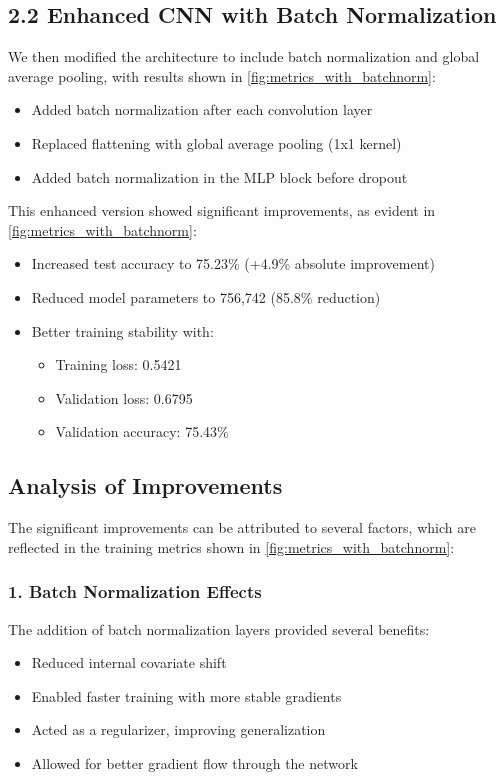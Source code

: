 \subsection{2.2 Enhanced CNN with Batch Normalization}
We then modified the architecture to include batch normalization and global average pooling, with results shown in \cref{fig:metrics_with_batchnorm}:

\begin{itemize}
    \item Added batch normalization after each convolution layer
    \item Replaced flattening with global average pooling (1x1 kernel)
    \item Added batch normalization in the MLP block before dropout
\end{itemize}

This enhanced version showed significant improvements, as evident in \cref{fig:metrics_with_batchnorm}:
\begin{itemize}
    \item Increased test accuracy to 75.23\% (+4.9\% absolute improvement)
    \item Reduced model parameters to 756,742 (85.8\% reduction)
    \item Better training stability with:
        \begin{itemize}
            \item Training loss: 0.5421
            \item Validation loss: 0.6795
            \item Validation accuracy: 75.43\%
        \end{itemize}
\end{itemize}

\subsection{Analysis of Improvements}

The significant improvements can be attributed to several factors, which are reflected in the training metrics shown in \cref{fig:metrics_with_batchnorm}:

\subsubsection{1. Batch Normalization Effects}
The addition of batch normalization layers provided several benefits:
\begin{itemize}
    \item Reduced internal covariate shift
    \item Enabled faster training with more stable gradients
    \item Acted as a regularizer, improving generalization
    \item Allowed for better gradient flow through the network
\end{itemize}

